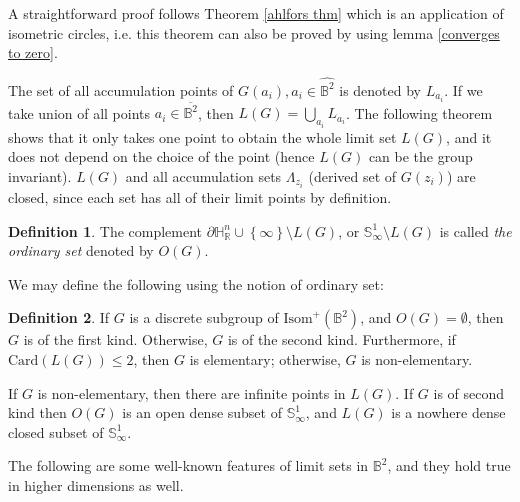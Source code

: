 \documentclass[12pt,oneside]{sfsuthesis}
\theoremstyle{plain} %
\theoremstyle{definition}  %
\newtheorem{definition}{Definition}[chapter]
\theoremstyle{remark}  %
\theoremstyle{plain}
\begin{document}
{A straightforward proof\cite[p.79]{ahlfors1981mobius} follows Theorem \ref{ahlfors thm} which is an application of isometric circles, i.e. this theorem can also be proved by using lemma \ref{converges to zero}. 

The set of all accumulation points of $G(a_i), a_i\in \widehat{\mathbb{B}^2}$ is denoted by $L_{a_i}$. If we take union of all points $a_i\in \overline{\mathbb{B}^2}$, then $L(G)=\bigcup_{a_i} L_{a_i}$. The following theorem shows that it only takes one point to obtain the whole limit set $L(G)$, and it does not depend on the choice of the point (hence $L(G)$ can be the group invariant). $L(G)$ and all accumulation sets $\Lambda_{z_i}$ (derived set of $G(z_i)$) are closed, since each set has all of their limit points by definition. 
\begin{definition}
The complement $\partial \mathbb{H}^n_\mathbb{R} \cup\left\lbrace \infty \right\rbrace\setminus L(G)$, or $\mathbb{S}^{1}_\infty\setminus L(G)$ is called \textit{the ordinary set} denoted by $O(G)$. 
\end{definition}

We may define the following using the notion of ordinary set:
\begin{definition}
If $G$ is a discrete subgroup of $\text{Isom}^+(\mathbb{B}^2)$, and $O(G)=\emptyset$, then $G$ is of the first kind. Otherwise, $G$ is of the second kind. Furthermore, if $\text{Card}(L(G))\leq 2$, then $G$ is elementary; otherwise, $G$ is non-elementary.
\end{definition}

If $G$ is non-elementary, then there are infinite points in $L(G)$. If $G$ is of second kind then $O(G)$ is an open dense subset of $\mathbb{S}^{1}_\infty$, and $L(G)$ is a nowhere dense closed subset of $\mathbb{S}^{1}_\infty$\cite[Theorem 12.2.7]{ratcliffe1994foundations}.

The following are some well-known features of limit sets in $\mathbb{B}^2$, and they hold true in higher dimensions as well.

}
\end{document}
